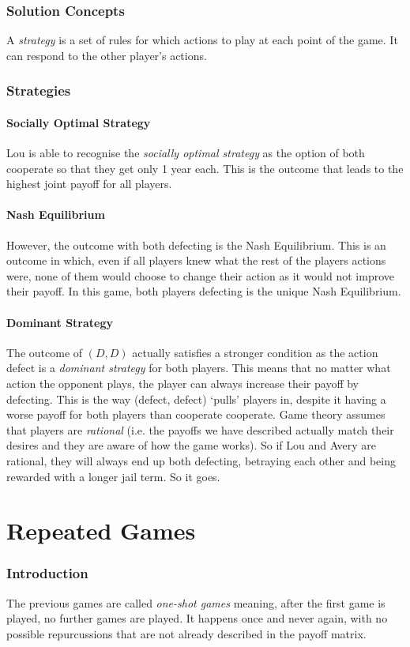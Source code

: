 \subsubsection{Solution Concepts}
A \textit{strategy} is a set of rules for which actions to play at each point of the game. It can respond to the other player's actions.
\subsubsection{Strategies}
\paragraph{Socially Optimal Strategy}Lou is able to recognise the \textit{socially optimal strategy} as the option of both cooperate so that they get only 1 year each. This is the outcome that leads to the highest joint payoff for all players.
\paragraph{Nash Equilibrium} However, the outcome with both defecting is the Nash Equilibrium. This is an outcome in which, even if all players knew what the rest of the players actions were, none of them would choose to change their action as it would not improve their payoff. In this game, both players defecting is the unique Nash Equilibrium.
\paragraph{Dominant Strategy}The outcome of $(D, D)$ actually satisfies a stronger condition as the action defect is a \textit{dominant strategy} for both players. This means that no matter what action the opponent plays, the player can always increase their payoff by defecting. This is the way (defect, defect) `pulls' players in, despite it having a worse payoff for both players than cooperate cooperate. Game theory assumes that players are \textit{rational} (i.e. the payoffs we have described actually match their desires and they are aware of how the game works). So if Lou and Avery are rational, they will always end up both defecting, betraying each other and being rewarded with a longer jail term. So it goes.

\section{Repeated Games}
\subsubsection{Introduction}
The previous games are called \textit{one-shot games} meaning, after the first game is played, no further games are played. It happens once and never again, with no possible repurcussions that are not already described in the payoff matrix.\\

